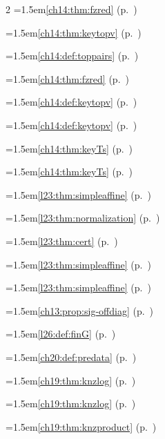 \begin{multicols}{2}
\hangindent=1.5em\quad \ref{ch14:thm:fzred} (p.~\pageref{ch14:thm:fzred})\par
\hangindent=1.5em\quad \ref{ch14:thm:keytopv} (p.~\pageref{ch14:thm:keytopv})\par
\hangindent=1.5em\quad \ref{ch14:def:toppairs} (p.~\pageref{ch14:def:toppairs})\par
\hangindent=1.5em\quad \ref{ch14:thm:fzred} (p.~\pageref{ch14:thm:fzred})\par
\hangindent=1.5em\quad \ref{ch14:def:keytopv} (p.~\pageref{ch14:def:keytopv})\par
\hangindent=1.5em\quad \ref{ch14:def:keytopv} (p.~\pageref{ch14:def:keytopv})\par
\hangindent=1.5em\quad \ref{ch14:thm:keyTs} (p.~\pageref{ch14:thm:keyTs})\par
\hangindent=1.5em\quad \ref{ch14:thm:keyTs} (p.~\pageref{ch14:thm:keyTs})\par
\hangindent=1.5em\quad \ref{l23:thm:simpleaffine} (p.~\pageref{l23:thm:simpleaffine})\par
\hangindent=1.5em\quad \ref{l23:thm:normalization} (p.~\pageref{l23:thm:normalization})\par
\hangindent=1.5em\quad \ref{l23:thm:cert} (p.~\pageref{l23:thm:cert})\par
\hangindent=1.5em\quad \ref{l23:thm:simpleaffine} (p.~\pageref{l23:thm:simpleaffine})\par
\hangindent=1.5em\quad \ref{l23:thm:simpleaffine} (p.~\pageref{l23:thm:simpleaffine})\par
\hangindent=1.5em\quad \ref{ch13:prop:sig-offdiag} (p.~\pageref{ch13:prop:sig-offdiag})\par
\hangindent=1.5em\quad \ref{l26:def:finG} (p.~\pageref{l26:def:finG})\par
\hangindent=1.5em\quad \ref{ch20:def:predata} (p.~\pageref{ch20:def:predata})\par
\hangindent=1.5em\quad \ref{ch19:thm:knzlog} (p.~\pageref{ch19:thm:knzlog})\par
\hangindent=1.5em\quad \ref{ch19:thm:knzlog} (p.~\pageref{ch19:thm:knzlog})\par
\hangindent=1.5em\quad \ref{ch19:thm:knzproduct} (p.~\pageref{ch19:thm:knzproduct})\par

\end{multicols}
